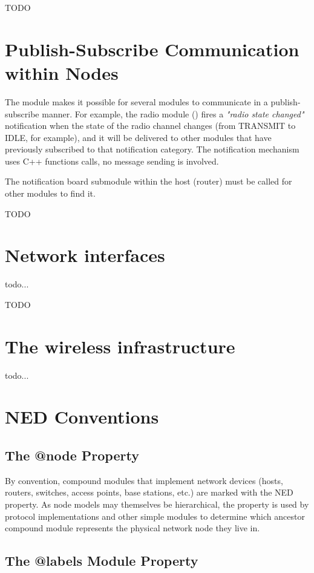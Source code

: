 \ifdraft TODO
\section{Publish-Subscribe Communication within Nodes}

The  module makes it possible for several modules to
communicate in a publish-subscribe manner. For example, the radio module
() fires a \textit{"radio state changed"} notification when
the state of the radio channel changes (from TRANSMIT to IDLE, for example),
and it will be delivered to other modules that have previously subscribed
to that notification category. The notification mechanism uses C++ functions
calls, no message sending is involved.

The notification board submodule within the host (router) must be called
 for other modules to find it.
\fi

\ifdraft TODO
\section{Network interfaces}

todo...
\fi

\ifdraft TODO
\section{The wireless infrastructure}

todo...
\fi


\section{NED Conventions}

\subsection{The @node Property}

By convention, compound modules that implement network devices (hosts,
routers, switches, access points, base stations, etc.) are marked with the
 NED property. As node models may themselves be hierarchical, the
 property is used by protocol implementations and other simple
modules to determine which ancestor compound module represents the physical
network node they live in.

\subsection{The @labels Module Property}

